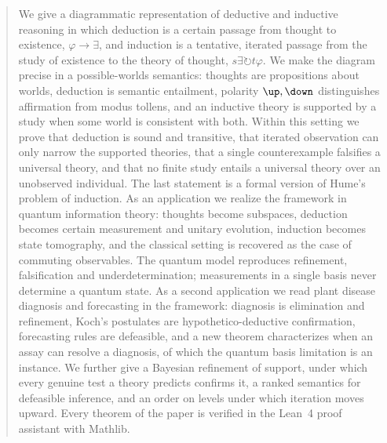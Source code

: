 \begin{abstract}
We give a diagrammatic representation of deductive and inductive reasoning in which deduction is a
certain passage from thought to existence, $\varphi \to \exists$, and induction is a tentative,
iterated passage from the study of existence to the theory of thought, $s\exists \circlearrowright
t\varphi$. We make the diagram precise in a possible-worlds semantics: thoughts are propositions
about worlds, deduction is semantic entailment, polarity $\up,\down$ distinguishes affirmation from
modus tollens, and an inductive theory is supported by a study when some world is consistent with
both. Within this setting we prove that deduction is sound and transitive, that iterated
observation can only narrow the supported theories, that a single counterexample falsifies a
universal theory, and that no finite study entails a universal theory over an unobserved
individual. The last statement is a formal version of Hume's problem of induction. As an
application we realize the framework in quantum information theory: thoughts become subspaces,
deduction becomes certain measurement and unitary evolution, induction becomes state tomography,
and the classical setting is recovered as the case of commuting observables. The quantum model
reproduces refinement, falsification and underdetermination; measurements in a single basis
never determine a quantum state. As a second application we read plant disease diagnosis and
forecasting in the framework: diagnosis is elimination and refinement, Koch's postulates are
hypothetico-deductive confirmation, forecasting rules are defeasible, and a new theorem
characterizes when an assay can resolve a diagnosis, of which the quantum basis limitation is
an instance. We
further give a Bayesian refinement of support, under which every genuine test a theory predicts
confirms it, a ranked semantics for defeasible inference, and an order on levels under which
iteration moves upward. Every theorem of the paper is verified in the Lean~4 proof assistant with
Mathlib.
\end{abstract}
